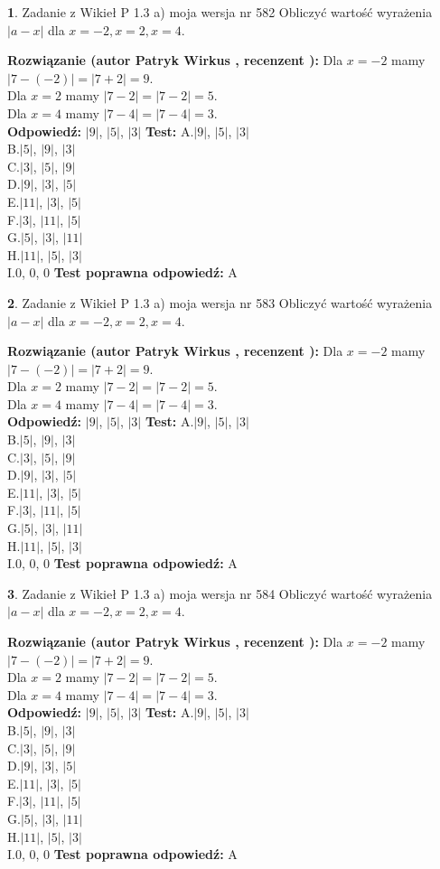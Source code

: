 \documentclass[12pt, a4paper]{article}
\theoremstyle{definition} %
\newtheorem{zad}{}
\newcommand{\zadStart}[1]{\begin{zad}#1\newline}
\newcommand{\zadStop}{\end{zad}}
\newcommand{\rozwStart}[2]{\noindent \textbf{Rozwiązanie (autor #1 , recenzent #2): }\newline}
\newcommand{\rozwStop}{\newline}
\newcommand{\odpStart}{\noindent \textbf{Odpowiedź:}\newline}
\newcommand{\odpStop}{\newline}
\newcommand{\testStart}{\noindent \textbf{Test:}\newline}
\newcommand{\testStop}{\newline}
\newcommand{\kluczStart}{\noindent \textbf{Test poprawna odpowiedź:}\newline}
\newcommand{\kluczStop}{\newline}
\begin{document}
\zadStart{Zadanie z Wikieł P 1.3 a) moja wersja nr 582}
Obliczyć wartość wyrażenia $|a - x|$ dla $x=-2,x=2,x=4$.
\zadStop
\rozwStart{Patryk Wirkus}{}
Dla $x = -2$ mamy $|7 - (-2)| = |7 + 2| = 9$.\\
Dla $x = 2$ mamy $|7 - 2| = |7 - 2| = 5$.\\
Dla $x = 4$ mamy $|7 - 4| = |7 - 4| = 3$.\\
\rozwStop
\odpStart
$|9|$, $|5|$, $|3|$
\odpStop
\testStart
A.$|9|$, $|5|$, $|3|$\\
B.$|5|$, $|9|$, $|3|$\\
C.$|3|$, $|5|$, $|9|$\\
D.$|9|$, $|3|$, $|5|$\\
E.$|11|$, $|3|$, $|5|$\\
F.$|3|$, $|11|$, $|5|$\\
G.$|5|$, $|3|$, $|11|$\\
H.$|11|$, $|5|$, $|3|$\\
I.$0$, $0$, $0$
\testStop
\kluczStart
A
\kluczStop



\zadStart{Zadanie z Wikieł P 1.3 a) moja wersja nr 583}
Obliczyć wartość wyrażenia $|a - x|$ dla $x=-2,x=2,x=4$.
\zadStop
\rozwStart{Patryk Wirkus}{}
Dla $x = -2$ mamy $|7 - (-2)| = |7 + 2| = 9$.\\
Dla $x = 2$ mamy $|7 - 2| = |7 - 2| = 5$.\\
Dla $x = 4$ mamy $|7 - 4| = |7 - 4| = 3$.\\
\rozwStop
\odpStart
$|9|$, $|5|$, $|3|$
\odpStop
\testStart
A.$|9|$, $|5|$, $|3|$\\
B.$|5|$, $|9|$, $|3|$\\
C.$|3|$, $|5|$, $|9|$\\
D.$|9|$, $|3|$, $|5|$\\
E.$|11|$, $|3|$, $|5|$\\
F.$|3|$, $|11|$, $|5|$\\
G.$|5|$, $|3|$, $|11|$\\
H.$|11|$, $|5|$, $|3|$\\
I.$0$, $0$, $0$
\testStop
\kluczStart
A
\kluczStop



\zadStart{Zadanie z Wikieł P 1.3 a) moja wersja nr 584}
Obliczyć wartość wyrażenia $|a - x|$ dla $x=-2,x=2,x=4$.
\zadStop
\rozwStart{Patryk Wirkus}{}
Dla $x = -2$ mamy $|7 - (-2)| = |7 + 2| = 9$.\\
Dla $x = 2$ mamy $|7 - 2| = |7 - 2| = 5$.\\
Dla $x = 4$ mamy $|7 - 4| = |7 - 4| = 3$.\\
\rozwStop
\odpStart
$|9|$, $|5|$, $|3|$
\odpStop
\testStart
A.$|9|$, $|5|$, $|3|$\\
B.$|5|$, $|9|$, $|3|$\\
C.$|3|$, $|5|$, $|9|$\\
D.$|9|$, $|3|$, $|5|$\\
E.$|11|$, $|3|$, $|5|$\\
F.$|3|$, $|11|$, $|5|$\\
G.$|5|$, $|3|$, $|11|$\\
H.$|11|$, $|5|$, $|3|$\\
I.$0$, $0$, $0$
\testStop
\kluczStart
A
\kluczStop
\end{document}
